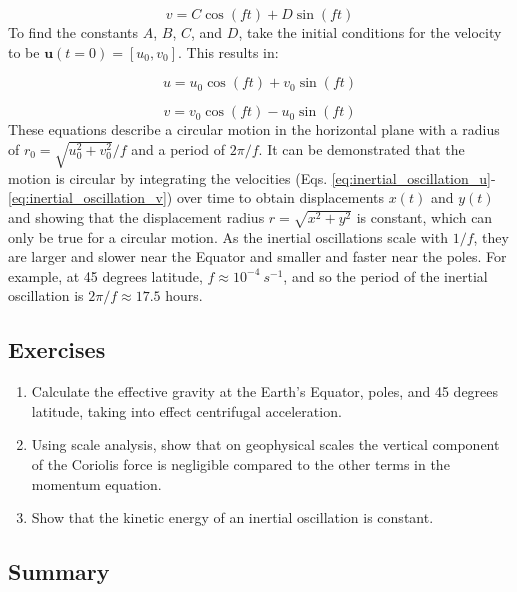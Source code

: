 \documentclass[12pt]{article}
\numberwithin{equation}{section}
\numberwithin{figure}{section}
\numberwithin{table}{section}
\begin{document}
\begin{equation}
  v = C \cos(f t) + D \sin(f t)
\end{equation}
To find the constants $A$, $B$, $C$, and $D$, take the initial conditions for
the velocity to be $\mathbf{u}(t=0) = [u_0, v_0]$.
This results in:

\begin{equation}
  u = u_0 \cos(f t) + v_0 \sin(f t)
  \label{eq:inertial_oscillation_u}
\end{equation}

\begin{equation}
  v = v_0 \cos(f t) - u_0 \sin(f t)
  \label{eq:inertial_oscillation_v}
\end{equation}
These equations describe a circular motion in the horizontal plane with a radius
of $r_0 = \sqrt{u_0^2 + v_0^2} / f$ and a period of $2\pi / f$.
It can be demonstrated that the motion is circular by integrating the velocities
(Eqs. \ref{eq:inertial_oscillation_u}-\ref{eq:inertial_oscillation_v}) over time
to obtain displacements $x(t)$ and $y(t)$ and showing that the displacement
radius $r = \sqrt{x^2 + y^2}$ is constant, which can only be true for a circular
motion.
As the inertial oscillations scale with $1/f$, they are larger and slower
near the Equator and smaller and faster near the poles.
For example, at 45 degrees latitude, $f \approx 10^{-4}\ s^{-1}$, and so the
period of the inertial oscillation is $2\pi/f \approx 17.5$ hours.

\subsection*{Exercises}

\begin{enumerate}
  \item Calculate the effective gravity at the Earth's Equator, poles, and 45 degrees
  latitude, taking into effect centrifugal acceleration.
  \item Using scale analysis, show that on geophysical scales the vertical
  component of the Coriolis force is negligible compared to the other terms
  in the momentum equation.
  \item Show that the kinetic energy of an inertial oscillation is constant.
\end{enumerate}

\subsection*{Summary}
\end{document}
